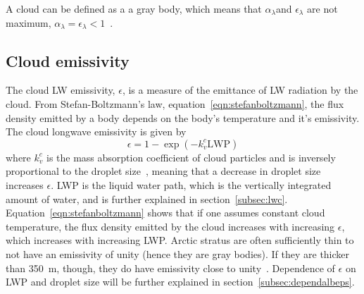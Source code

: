 A cloud can be defined as a a gray body, which means that $\alpha_{\lambda}$and $\epsilon_{\lambda}$ are not maximum, $\alpha_{\lambda}=\epsilon_{\lambda}<1$~\citep{Liou2002}.

\subsection{Cloud emissivity}
The cloud LW emissivity, $\epsilon$, is a measure of the emittance of LW radiation by the cloud. From Stefan-Boltzmann's law, equation~\ref{eqn:stefanboltzmann}, the flux density emitted by a body depends on the body's temperature and it's emissivity. The cloud longwave emissivity is given by~\cite{Liou1992}
\begin{equation}
\epsilon = 1 - \exp(-k_v^c \text{LWP})
\label{eqn:epsilon_lw}
\end{equation}
where $k_v^c$ is the mass absorption coefficient of cloud particles and is inversely proportional to the droplet size~\citep{Alterskjaer2010}, meaning that a decrease in droplet size increases $\epsilon$. LWP is the liquid water path, which is the vertically integrated amount of water, and is further explained in section~\ref{subsec:lwc}. Equation~\ref{eqn:stefanboltzmann} shows that if one assumes constant cloud temperature, the flux density emitted by the cloud increases with increasing $\epsilon$, which increases with increasing LWP. Arctic stratus are often sufficiently thin to not have an emissivity of unity (hence they are gray bodies). If they are thicker than 350~m, though, they do have emissivity close to unity~\citep{Herman1980}. Dependence of $\epsilon$ on LWP and droplet size will be further explained in section~\ref{subsec:dependalbeps}.

